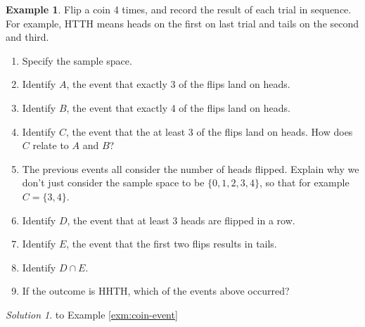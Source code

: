\documentclass[
]{book}
\providecommand{\tightlist}{%
  \setlength{\itemsep}{0pt}\setlength{\parskip}{0pt}}
\theoremstyle{definition}
\theoremstyle{definition}
\newtheorem{example}{Example}[chapter]
\theoremstyle{definition}
\theoremstyle{remark}
\newtheorem*{solution}{Solution}
\begin{document}
\begin{example}
\protect\hypertarget{exm:coin-event}{}{\label{exm:coin-event} }Flip a coin 4 times, and record the result of each trial in sequence. For example, HTTH means heads on the first on last trial and tails on the second and third.
\end{example}

\begin{enumerate}
\def\labelenumi{\arabic{enumi}.}
\tightlist
\item
  Specify the sample space.
\item
  Identify \(A\), the event that exactly 3 of the flips land on heads.
\item
  Identify \(B\), the event that exactly 4 of the flips land on heads.
\item
  Identify \(C\), the event that the at least 3 of the flips land on heads. How does \(C\) relate to \(A\) and \(B\)?
\item
  The previous events all consider the number of heads flipped. Explain why we don't just consider the sample space to be \(\{0, 1, 2, 3, 4\}\), so that for example \(C = \{3, 4\}\).
\item
  Identify \(D\), the event that at least 3 heads are flipped in a row.
\item
  Identify \(E\), the event that the first two flips results in tails.
\item
  Identify \(D\cap E\).
\item
  If the outcome is HHTH, which of the events above occurred?
\end{enumerate}

\begin{solution}
{}to Example \ref{exm:coin-event}
\end{solution}
\end{document}
